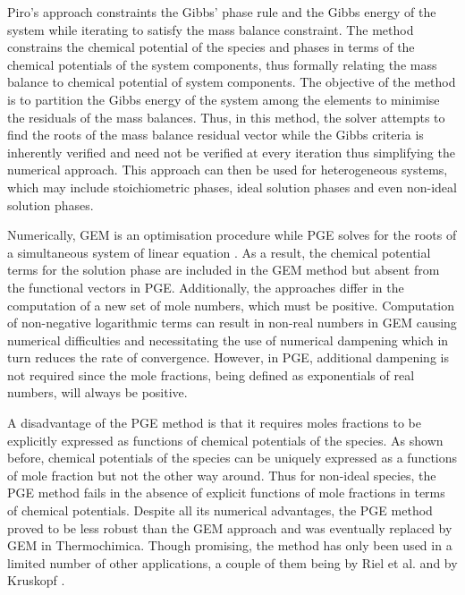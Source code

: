 	Piro's approach \cite{Piro13} constraints the Gibbs' phase rule and the Gibbs energy of the system while iterating to satisfy the mass balance constraint. The method constrains the chemical potential of the species and phases in terms of the chemical potentials of the system components, thus formally relating the mass balance to chemical potential of system components. The objective of the method is to partition the Gibbs energy of the system among the elements to minimise the residuals of the mass balances. Thus, in this method, the solver attempts to find the roots of the mass balance residual vector while the Gibbs criteria is inherently verified and need not be verified at every iteration thus simplifying the numerical approach. This approach can then be used for heterogeneous systems, which may include stoichiometric phases, ideal solution phases and even non-ideal solution phases.

	Numerically, GEM is an optimisation procedure while PGE solves for the roots of a simultaneous system of linear equation \cite{vanZeggeren11}. As a result, the chemical potential terms for the solution phase are included in the GEM method but absent from the functional vectors in PGE. Additionally, the approaches differ in the computation of a new set of mole numbers, which must be positive. Computation of non-negative logarithmic terms can result in non-real numbers in GEM causing numerical difficulties and necessitating the use of numerical dampening which in turn reduces the rate of convergence. However, in PGE, additional dampening is not required since the mole fractions, being defined as exponentials of real numbers, will always be positive.

	A disadvantage of the PGE method is that it requires moles fractions to be explicitly expressed as functions of chemical potentials of the species. As shown before, chemical potentials of the species can be uniquely expressed as a functions of mole fraction but not the other way around. Thus for non-ideal species, the PGE method fails in the absence of explicit functions of mole fractions in terms of chemical potentials. Despite all its numerical advantages, the PGE method proved to be less robust than the GEM approach and was eventually replaced by GEM in Thermochimica. Though promising, the method has only been used in a limited number of other applications, a couple of them being by Riel et al. \cite{Riel:2022aa} and by Kruskopf \cite{Kruskopf:2018aa}.

